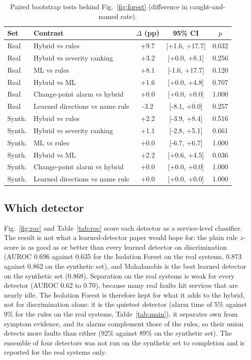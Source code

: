 \documentclass[journal]{IEEEtran}
\begin{document}
\begin{table}[!t]
\centering
\caption{Paired bootstrap tests behind Fig.~\ref{fig:forest} (difference in caught-and-named rate).}
\label{tab:paired}
\footnotesize
\begin{tabular}{llccc}
\toprule
Set & Contrast & $\Delta$ (pp) & 95\% CI & $p$ \\
\midrule
Real & Hybrid vs rules & +9.7 & [+1.6, +17.7] & 0.032 \\
Real & Hybrid vs severity ranking & +3.2 & [+0.0, +8.1] & 0.256 \\
Real & ML vs rules & +8.1 & [-1.6, +17.7] & 0.120 \\
Real & Hybrid vs ML & +1.6 & [+0.0, +4.8] & 0.707 \\
Real & Change-point alarm vs hybrid & +0.0 & [+0.0, +0.0] & 1.000 \\
Real & Learned directions vs name rule & -3.2 & [-8.1, +0.0] & 0.257 \\
Synth. & Hybrid vs rules & +2.2 & [-3.9, +8.4] & 0.516 \\
Synth. & Hybrid vs severity ranking & +1.1 & [-2.8, +5.1] & 0.661 \\
Synth. & ML vs rules & +0.0 & [-6.7, +6.7] & 1.000 \\
Synth. & Hybrid vs ML & +2.2 & [+0.6, +4.5] & 0.036 \\
Synth. & Change-point alarm vs hybrid & +0.0 & [+0.0, +0.0] & 1.000 \\
Synth. & Learned directions vs name rule & +0.0 & [+0.0, +0.0] & 1.000 \\
\bottomrule
\end{tabular}
\end{table}

\subsection{Which detector}
Fig.~\ref{fig:roc} and Table~\ref{tab:roc} score each detector as a service-level classifier. The result is not what a learned-detector paper would
hope for: the plain rule $z$-score is as good as or better than every learned detector on discrimination (AUROC 0.696 against 0.635 for the Isolation Forest on
the real systems, 0.873 against 0.862 on the synthetic set), and Mahalanobis is the best learned detector on the synthetic set (0.868). Separation on the real
systems is weak for every detector (AUROC 0.62 to 0.70), because many real faults hit services that are nearly idle. The Isolation Forest is therefore kept for what
it adds to the hybrid, not for discrimination alone: it is the quietest detector (alarm time of 5\% against 9\% for the rules on the real systems, Table~\ref{tab:main}),
it separates own from symptom evidence, and its alarms complement those of the rules, so their union detects more faults than either (92\% against 89\% on the synthetic
set). The ensemble of four detectors was not run on the synthetic set to completion and is reported for the real systems only.
\end{document}

